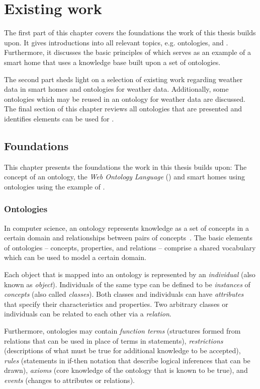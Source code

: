 \chapter{Existing work}
\label{ch:existing_work}

The first part of this chapter covers the foundations the work of this thesis builds upon. It gives introductions into all relevant topics, e.g. ontologies,  and . Furthermore, it discusses the basic principles of \thinkhome which serves as an example of a smart home that uses a knowledge base built upon a set of ontologies.

The second part sheds light on a selection of existing work regarding weather data in smart homes and ontologies for weather data. Additionally, some ontologies which may be reused in an ontology for weather data are discussed. The final section of this chapter reviews all ontologies that are presented and identifies elements can be used for \smarthomeweather.

\section{Foundations}

This chapter presents the foundations the work in this thesis builds upon: The concept of an ontology, the \emph{Web Ontology Language} () and smart homes using ontologies using the example of \thinkhome.

\subsection{Ontologies}
\label{subsec:ontologies}

In computer science, an ontology represents knowledge as a set of concepts in a certain domain and relationships between pairs of concepts~\cite{OntologiesSilverBullet}. The basic elements of ontologies -- concepts, properties, and relations -- comprise a shared vocabulary which can be used to model a certain domain.

Each object that is mapped into an ontology is represented by an \emph{individual} (also known as \emph{object}). Individuals of the same type can be defined to be \emph{instances} of \emph{concepts} (also called \emph{classes}). Both classes and individuals can have \emph{attributes} that specify their characteristics and properties. Two arbitrary classes or individuals can be related to each other via a \emph{relation}.

Furthermore, ontologies may contain \emph{function terms} (structures formed from relations that can be used in place of terms in statements), \emph{restrictions} (descriptions of what must be true for additional knowledge to be accepted), \emph{rules} (statements in if-then notation that describe logical inferences that can be drawn), \emph{axioms} (core knowledge of the ontology that is known to be true), and \emph{events} (changes to attributes or relations).

